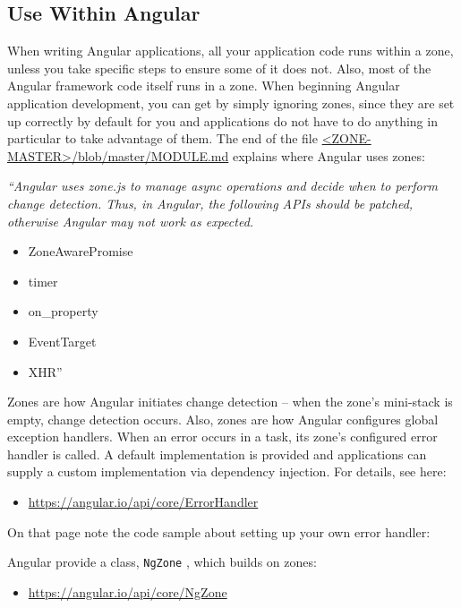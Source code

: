 \subsection{Use Within Angular}

When writing Angular applications, all your application code runs within a zone, unless
you take specific steps to ensure some of it does not. Also, most of the Angular
framework code itself runs in a zone. When beginning Angular application
development, you can get by simply ignoring zones, since they are set up correctly by
default for you and applications do not have to do anything in particular to take
advantage of them. The end of the file
\href{https://github.com/angular/zone.js/blob/master/MODULE.md}
{<ZONE-MASTER>/blob/master/MODULE.md}
explains where Angular uses zones:

\emph{“Angular uses zone.js to manage async operations and decide when to perform}
\emph{change detection. Thus, in Angular, the following APIs should be patched, otherwise}
\emph{Angular may not work as expected.}

\begin{itemize}
  \item ZoneAwarePromise
  \item timer
  \item on\_property
  \item EventTarget
  \item XHR”
\end{itemize}

Zones are how Angular initiates change detection – when the zone’s mini-stack is
empty, change detection occurs. Also, zones are how Angular configures global
exception handlers. When an error occurs in a task, its zone’s configured error handler
is called. A default implementation is provided and applications can supply a custom
implementation via dependency injection. For details, see here:

\begin{itemize}
  \item \url{https://angular.io/api/core/ErrorHandler}
\end{itemize}

On that page note the code sample about setting up your own error handler:



Angular provide a class,
\texttt{NgZone}
, which builds on zones:

\begin{itemize}
  \item \url{https://angular.io/api/core/NgZone}
\end{itemize}

